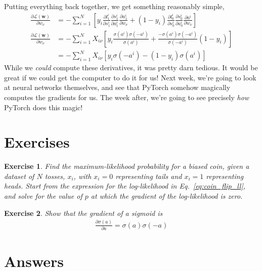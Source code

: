 \documentclass{article}
\newtheorem{exercise}{Exercise}
\newcommand{\dd}[2][]{\frac{\partial #1}{\partial #2}}
\newcommand{\bracket}[3]{\left#1 #3 \right#2}
\newcommand{\sqb}{\bracket{[}{]}}
\newcommand{\w}{\mathbf{w}}
\renewcommand{\L}{\mathcal{L}}
\begin{document}
Putting everything back together, we get something reasonably simple,
\begin{align}
  \dd[\L(\w)]{w_\nu} &= - \sum_{i=1}^N \sqb{y_i \dd[l^i_1]{s^i_1} \dd[s^i_1]{a^i_1} \dd[a^i_1]{w_\nu} + (1-y_i) \dd[l^i_0]{s^i_0} \dd[s^i_0]{a^i_0} \dd[a^i]{w_\nu}}\\
  \dd[\L(\w)]{w_\nu} &= - \sum_{i=1}^N X_{i \nu} \sqb{y_i \frac{\sigma(a^i) \sigma(- a^i)}{\sigma(a^i)} + \frac{-\sigma(a^i) \sigma(- a^i)}{\sigma(-a^i)} (1-y_i) }\\
  &= - \sum_{i=1}^N X_{i \nu} \sqb{y_i \sigma(-a^i) - (1-y_i) \sigma(a^i)}
\end{align}
While we \textit{could} compute these derivatives, it was pretty darn tedious.
It would be great if we could get the computer to do it for us!
Next week, we're going to look at neural networks themselves, and see that PyTorch somehow magically computes the gradients for us.
The week after, we're going to see precisely \textit{how} PyTorch does this magic!


\section{Exercises}

\begin{exercise}
  Find the maximum-likelihood probability for a biased coin, given a dataset of $N$ tosses, $x_i$, with $x_i=0$ representing tails and $x_i=1$ representing heads.
  Start from the expression for the log-likelihood in Eq.~\ref{eq:coin_flip_ll}, and solve for the value of $p$ at which the gradient of the log-likelihood is zero.
\end{exercise}

\begin{exercise}
  Show that the gradient of a sigmoid is
  \begin{align}
    \dd[\sigma(a)]{a} = \sigma(a) \sigma(-a)
  \end{align}
\end{exercise}

\section{Answers}
\end{document}
